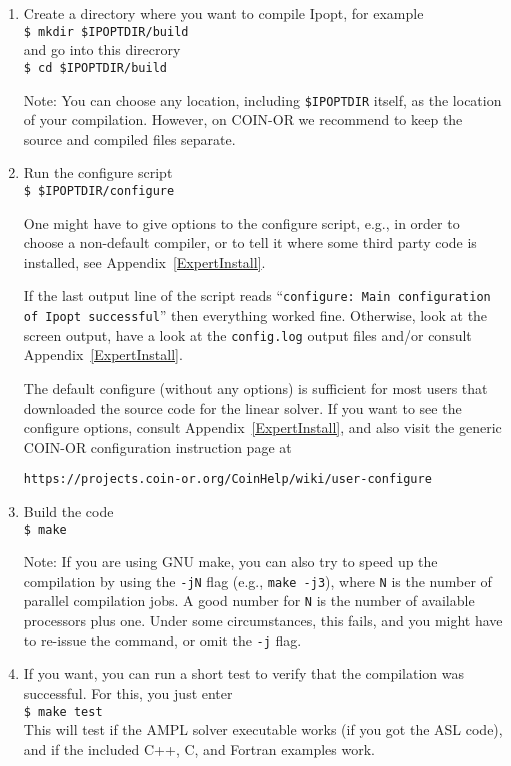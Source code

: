 \documentclass[10pt]{article}
\newcommand{\Ipopt}{{\sc Ipopt}}
\begin{document}
\begin{enumerate}
\item Create a directory where you want to compile \Ipopt, for example\\
  {\tt \$ mkdir \$IPOPTDIR/build}\\
  and go into this direcrory\\
  {\tt \$ cd \$IPOPTDIR/build}

  Note: You can choose any location, including {\tt \$IPOPTDIR}
  itself, as the location of your compilation.  However, on COIN-OR we
  recommend to keep the source and compiled files separate.

\item Run the configure script\\
  {\tt \$ \$IPOPTDIR/configure}

  One might have to give options to the configure script, e.g., in
  order to choose a non-default compiler, or to tell it where some
  third party code is installed, see Appendix~\ref{ExpertInstall}.

  If the last output line of the script reads ``\texttt{configure:
    Main configuration of Ipopt successful}'' then everything worked
  fine.  Otherwise, look at the screen output, have a look at the
  \texttt{config.log} output files and/or consult
  Appendix~\ref{ExpertInstall}.

  The default configure (without any options) is sufficient for most
  users that downloaded the source code for the linear solver. If you
  want to see the configure options, consult
  Appendix~\ref{ExpertInstall}, and also visit the generic COIN-OR
  configuration instruction page at

  \centerline{\texttt{https://projects.coin-or.org/CoinHelp/wiki/user-configure}}

\item Build the code \\
  {\tt \$ make}

  Note: If you are using GNU make, you can also try to speed up the
  compilation by using the {\tt -jN} flag (e.g., {\tt make -j3}),
  where {\tt N} is the number of parallel compilation jobs.  A good
  number for {\tt N} is the number of available processors plus one.
  Under some circumstances, this fails, and you might have to re-issue
  the command, or omit the {\tt -j} flag.
\item If you want, you can run a short test to verify that the
  compilation was successful.  For this, you just
  enter\\
  {\tt \$ make test}\\
  This will test if the AMPL solver executable works (if you got the
  ASL code), and if the included C++, C, and Fortran examples work.


\end{enumerate}
\end{document}
